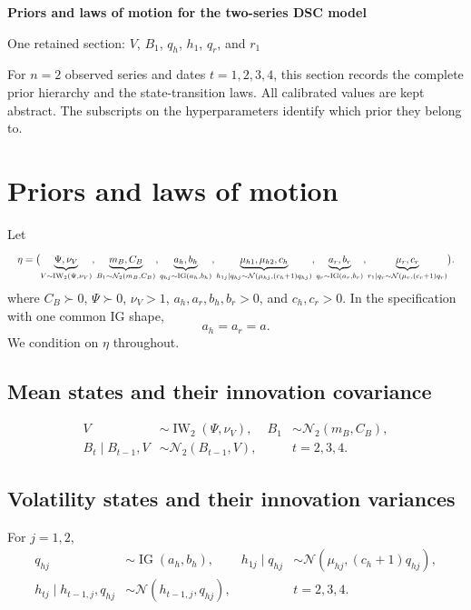 \documentclass[10pt,a4paper]{article}
\newcommand{\N}{\mathcal N}
\newcommand{\IG}{\operatorname{IG}}
\newcommand{\IW}{\operatorname{IW}}
\begin{document}
{\color{ink}\LARGE\bfseries Priors and laws of motion for the two-series DSC model\par}
\vspace{2pt}
{\color{teal}\large One retained section: $V$, $B_1$, $q_h$, $h_1$, $q_r$, and $r_1$}

For $n=2$ observed series and dates $t=1,2,3,4$, this section records the complete
prior hierarchy and the state-transition laws. All calibrated values are kept abstract.
The subscripts on the hyperparameters identify which prior they belong to.

\section*{Priors and laws of motion}

Let
\[
\resizebox{\textwidth}{!}{$\displaystyle
\eta=\bigl(
\underbrace{\Psi,\nu_V}_{V\sim \IW_2(\Psi,\nu_V)},
\underbrace{m_B,C_B}_{B_1\sim \N_2(m_B,C_B)},
\underbrace{a_h,b_h}_{q_{hj}\sim \IG(a_h,b_h)},
\underbrace{\mu_{h1},\mu_{h2},c_h}_{h_{1j}\mid q_{hj}\sim \N(\mu_{hj},(c_h+1)q_{hj})},
\underbrace{a_r,b_r}_{q_r\sim \IG(a_r,b_r)},
\underbrace{\mu_r,c_r}_{r_1\mid q_r\sim \N(\mu_r,(c_r+1)q_r)}
\bigr).
$}
\]
where $C_B\succ0$, $\Psi\succ0$, $\nu_V>1$, $a_h,a_r,b_h,b_r>0$, and
$c_h,c_r>0$. In the specification with one common IG shape,
\[
  a_h=a_r=a.
\]
We condition on $\eta$ throughout.

\subsection*{Mean states and their innovation covariance}

\begin{align*}
V &\sim \IW_2(\Psi,\nu_V),
& B_1 &\sim \N_2(m_B,C_B),\\
B_t\mid B_{t-1},V &\sim \N_2(B_{t-1},V),
&& t=2,3,4.
\end{align*}


\subsection*{Volatility states and their innovation variances}

For $j=1,2$,
\begin{align*}
q_{hj} &\sim \IG(a_h,b_h),
& h_{1j}\mid q_{hj} &\sim \N\!\left(\mu_{hj},(c_h+1)q_{hj}\right),\\
h_{tj}\mid h_{t-1,j},q_{hj}
  &\sim \N(h_{t-1,j},q_{hj}),
&& t=2,3,4.
\end{align*}
\end{document}
